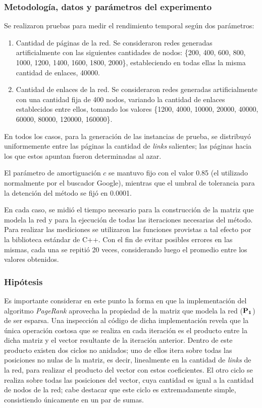             \subsubsection*{Metodología, datos y parámetros del experimento}
                Se realizaron pruebas para medir el rendimiento temporal según dos parámetros:
                \begin{enumerate}[label=(\alph*)]
                    \item Cantidad de páginas de la red. Se consideraron redes generadas artificialmente con las siguientes cantidades de nodos: \{200, 400, 600, 800, 1000, 1200, 1400, 1600, 1800, 2000\}, estableciendo en todas ellas la misma cantidad de enlaces, 40000.

                    \item Cantidad de enlaces de la red. Se consideraron redes generadas artificialmente con una cantidad fija de 400 nodos, variando la cantidad de enlaces establecidos entre ellos, tomando los valores \{1200, 4000, 10000, 20000, 40000, 60000, 80000, 120000, 160000\}.
                \end{enumerate}

                En todos los casos, para la generación de las instancias de prueba, se distribuyó uniformemente entre las páginas la cantidad de \emph{links} salientes; las páginas hacia los que estos apuntan fueron determinadas al azar.

                El parámetro de amortiguación $c$ se mantuvo fijo con el valor 0.85 (el utilizado normalmente por el buscador Google\cite{Brin1998}), mientras que el umbral de tolerancia para la detención del método se fijó en 0.0001.

                En cada caso, se midió el tiempo necesario para la construcción de la matriz que modela la red y para la ejecución de todas las iteraciones necesarias del método. Para realizar las mediciones se utilizaron las funciones provistas a tal efecto por la biblioteca estándar de C++. Con el fin de evitar posibles errores en las mismas, cada una se repitió 20 veces, considerando luego el promedio entre los valores obtenidos.

            \subsubsection*{Hipótesis}
            Es importante considerar en este punto la forma en que la implementación del algoritmo \emph{PageRank} aprovecha la propiedad de la matriz que modela la red ($\mathbf{P_1}$) de ser esparsa. Una inspección al código de dicha implementación revela que la única operación costosa que se realiza en cada iteración es  el producto entre la dicha matriz y el vector resultante de la iteración anterior. Dentro de este producto existen dos ciclos no anidados; uno de ellos itera sobre todas las posiciones no nulas de la matriz, es decir, linealmente en la cantidad de \emph{links} de la red, para realizar el producto del vector con estos coeficientes. El otro ciclo se realiza sobre todas las posiciones del vector, cuya cantidad es igual a la cantidad de nodos de la red; cabe destacar que este ciclo es extremadamente simple, consistiendo únicamente en un par de sumas.

